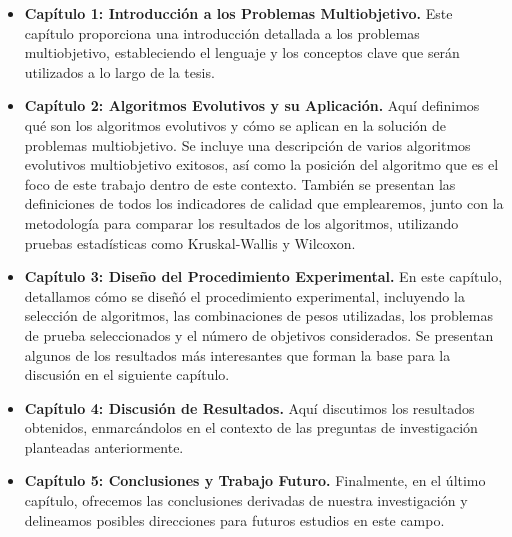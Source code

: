 \begin{itemize}
    \item \textbf{Capítulo 1: Introducción a los Problemas Multiobjetivo.} Este capítulo proporciona una introducción detallada a los problemas multiobjetivo, estableciendo el lenguaje y los conceptos clave que serán utilizados a lo largo de la tesis.
    \item \textbf{Capítulo 2: Algoritmos Evolutivos y su Aplicación.} Aquí definimos qué son los algoritmos evolutivos y cómo se aplican en la solución de problemas multiobjetivo. Se incluye una descripción de varios algoritmos evolutivos multiobjetivo exitosos, así como la posición del algoritmo que es el foco de este trabajo dentro de este contexto. También se presentan las definiciones de todos los indicadores de calidad que emplearemos, junto con la metodología para comparar los resultados de los algoritmos, utilizando pruebas estadísticas como Kruskal-Wallis y Wilcoxon.
    \item \textbf{Capítulo 3: Diseño del Procedimiento Experimental.} En este capítulo, detallamos cómo se diseñó el procedimiento experimental, incluyendo la selección de algoritmos, las combinaciones de pesos utilizadas, los problemas de prueba seleccionados y el número de objetivos considerados. Se presentan algunos de los resultados más interesantes que forman la base para la discusión en el siguiente capítulo.
    \item \textbf{Capítulo 4: Discusión de Resultados.} Aquí discutimos los resultados obtenidos, enmarcándolos en el contexto de las preguntas de investigación planteadas anteriormente.
    \item \textbf{Capítulo 5: Conclusiones y Trabajo Futuro.} Finalmente, en el último capítulo, ofrecemos las conclusiones derivadas de nuestra investigación y delineamos posibles direcciones para futuros estudios en este campo.
\end{itemize}





